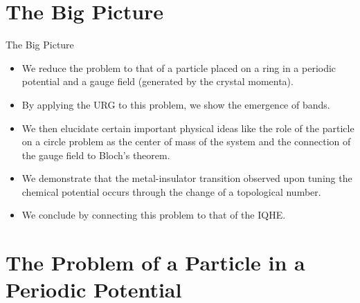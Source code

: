 \documentclass[aspectratio=169,t]{beamer}
\begin{document}
\section{The Big Picture}

\begin{frame}{The Big Picture}
\begin{itemize}[<+->]
	\item We reduce the problem to that of a \alert{particle placed on a ring} in a periodic potential and a gauge field (generated by the crystal momenta).\\[10pt]
	\item By applying the URG to this problem, we show the \alert{emergence of bands}.\\[10pt]
	\item We then elucidate certain important physical ideas like the role of the particle on a circle problem as the \alert{center of mass} of the system and the connection of the gauge field to Bloch’s theorem.\\[10pt]
	\item We demonstrate that the metal-insulator transition observed upon tuning the chemical potential occurs through the change of a \alert{topological number}.\\[10pt]
	\item We conclude by connecting this problem to that of the \alert{IQHE}.
\end{itemize}
\end{frame}

\section{The Problem of a Particle in a Periodic Potential}
\end{document}
